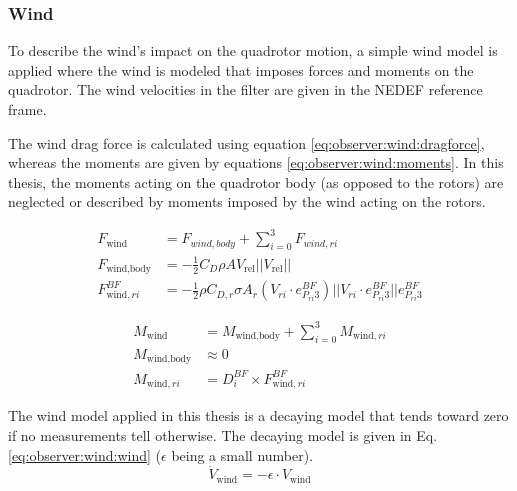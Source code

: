 \subsubsection{Wind}
    To describe the wind's impact on the quadrotor motion,
    a simple wind model is applied where the wind is modeled
    that imposes forces and moments on the quadrotor.
    The wind velocities in the filter are given in the NEDEF reference frame.

    The wind drag force is calculated using equation \eqref{eq:observer:wind:dragforce},
    whereas the moments are given by equations \eqref{eq:observer:wind:moments}.
    In this thesis, the moments acting on the quadrotor body (as opposed to the rotors)
    are neglected or described by moments imposed by the wind acting on the rotors.

    \begin{subequations}
    \label{eq:observer:wind:dragforce}
        \begin{align}
            F_{\text{wind}} &= F_{wind,body} + \sum_{i=0}^{3} F_{wind,ri} \\
%
            F_{\text{wind,body}} &= -\frac{1}{2} C_{D} \rho A V_{\text{rel}} ||V_{\text{rel}}|| \\
%
            F^{BF}_{\text{wind},ri} &= -\frac{1}{2} \rho C_{D,r} \sigma A_{r} (V_{ri} \cdot e_{P_{ri}3}^{BF}) ||V_{ri} \cdot e_{P_{ri}3}^{BF}|| e_{P_{ri}3}^{BF}
        \end{align}
    \end{subequations}

    \begin{subequations}
    \label{eq:observer:wind:moments}
        \begin{align}
            M_{\text{wind}} &= M_{\text{wind,body}} + \sum_{i=0}^{3}M_{\text{wind},ri} \\
%
            M_{\text{wind,body}} &\approx 0 \\ %
%
            M_{\text{wind},ri} &= D_{i}^{BF} \times F^{BF}_{\text{wind},ri}
        \end{align}
    \end{subequations}

    The wind model applied in this thesis is a decaying model that tends toward zero if no measurements tell otherwise.
    The decaying model is given in Eq. \eqref{eq:observer:wind:wind} ($\epsilon$ being a small number).
    \begin{equation}
        \label{eq:observer:wind:wind}
        \dot{V}_{\text{wind}} = -\epsilon \cdot V_{\text{wind}}
    \end{equation}


